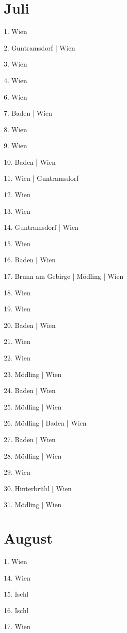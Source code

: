 \documentclass[twoside=false,titlepage=false,open=any, parskip=never, fontsize=10pt, headings=small, chapterprefix=false, appendixprefix=false, DIV=15]{scrbook}
\begin{document}
\begin{multicols}{3}
            \section*{Juli}
            1. Wien\par
            2. Guntramsdorf | Wien\par
            3. Wien\par
            4. Wien\par
            6. Wien\par
            7. Baden | Wien\par
            8. Wien\par
            9. Wien\par
            10. Baden | Wien\par
            11. Wien | Guntramsdorf\par
            12. Wien\par
            13. Wien\par
            14. Guntramsdorf | Wien\par
            15. Wien\par
            16. Baden | Wien\par
            17. Brunn am Gebirge | Mödling | Wien\par
            18. Wien\par
            19. Wien\par
            20. Baden | Wien\par
            21. Wien\par
            22. Wien\par
            23. Mödling | Wien\par
            24. Baden | Wien\par
            25. Mödling | Wien\par
            26. Mödling | Baden | Wien\par
            27. Baden | Wien\par
            28. Mödling | Wien\par
            29. Wien\par
            30. Hinterbrühl | Wien\par
            31. Mödling | Wien\par
            \section*{August}
            1. Wien\par
            14. Wien\par
            15. Ischl\par
            16. Ischl\par
            17. Wien\par

\end{multicols}
\end{document}
